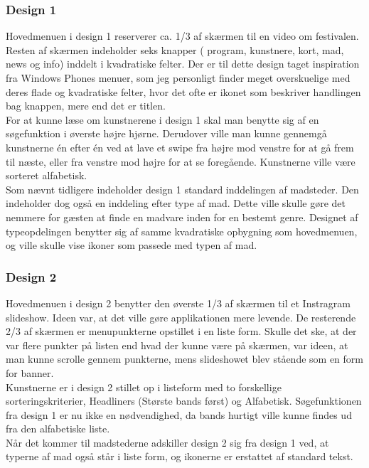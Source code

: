 \documentclass[a4paper,10pt,titlepage]{article}
\begin{document}
\subsubsection{Design 1}
Hovedmenuen i design 1 reserverer ca. 1/3 af skærmen til en video om festivalen. Resten af skærmen indeholder seks knapper ( program, kunstnere, kort, mad, news og info) inddelt i kvadratiske felter. Der er til dette design taget inspiration fra Windows Phones menuer, som jeg personligt finder meget overskuelige med deres flade og kvadratiske felter, hvor det ofte er ikonet som beskriver handlingen bag knappen, mere end det er titlen.\\
For at kunne læse om kunstnerene i design 1 skal man benytte sig af en søgefunktion i øverste højre hjørne. Derudover ville man kunne gennemgå kunstnerne én efter én ved at lave et swipe fra højre mod venstre for at gå frem til næste, eller fra venstre mod højre for at se foregående. Kunstnerne ville være sorteret alfabetisk.\\
Som nævnt tidligere indeholder design 1 standard inddelingen af madsteder. Den indeholder dog også en inddeling efter type af mad. Dette ville skulle gøre det nemmere for gæsten at finde en madvare inden for en bestemt genre. Designet af typeopdelingen benytter sig af samme kvadratiske opbygning som hovedmenuen, og ville skulle vise ikoner som passede med typen af mad.
\subsubsection{Design 2}
Hovedmenuen i design 2 benytter den øverste 1/3 af skærmen til et Instragram slideshow. Ideen var, at det ville gøre applikationen mere levende. De resterende 2/3 af skærmen er menupunkterne opstillet i en liste form. Skulle det ske, at der var flere punkter på listen end hvad der kunne være på skærmen, var ideen, at man kunne scrolle gennem punkterne, mens slideshowet blev stående som en form for banner.\\
Kunstnerne er i design 2 stillet op i listeform med to forskellige sorteringskriterier, Headliners (Største bands først) og Alfabetisk.  Søgefunktionen fra design 1 er nu ikke en nødvendighed, da bands hurtigt ville kunne findes ud fra den alfabetiske liste.\\
Når det kommer til madstederne adskiller design 2 sig fra design 1 ved, at typerne af mad også står i liste form, og ikonerne er erstattet af standard tekst.
\end{document}

